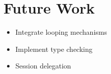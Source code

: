 \cleardoublepage
\chapter{Future Work}
\label{ch:futurework}

\begin{itemize}
\item Integrate looping mechanisms
\item Implement type checking
\item Session delegation
\end{itemize}